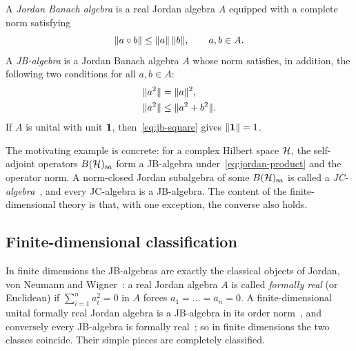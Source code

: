 \begin{definition}[JB-algebra]\label{def:jb-algebra}
A \emph{Jordan Banach algebra} is a real Jordan algebra $A$ equipped with a
complete norm satisfying
\begin{equation}\label{eq:submultiplicative}
  \lVert a \circ b \rVert \le \lVert a \rVert\,\lVert b \rVert, \qquad a,b\in A.
\end{equation}
A \emph{JB-algebra} is a Jordan Banach algebra $A$ whose norm satisfies, in
addition, the following two conditions for all $a,b\in A$:
\begin{align}
  \lVert a^2 \rVert &= \lVert a \rVert^2, \label{eq:jb-square}\\
  \lVert a^2 \rVert &\le \lVert a^2 + b^2 \rVert. \label{eq:jb-sum-of-squares}
\end{align}
If $A$ is unital with unit $\mathbf{1}$, then~\eqref{eq:jb-square} gives $\lVert \mathbf{1} \rVert=1$.
\end{definition}


The motivating example is concrete: for a complex Hilbert space $\mathcal{H}$, the
self-adjoint operators $B(\mathcal{H})_{\mathrm{sa}}$ form a JB-algebra under~\eqref{eq:jordan-product}
and the operator norm. A norm-closed Jordan subalgebra of some $B(\mathcal{H})_{\mathrm{sa}}$ is called a
\emph{JC-algebra}~\cite[3.1.2]{HancheOlsenStormer1984}, and every JC-algebra is a
JB-algebra. The content of the finite-dimensional theory is that, with one
exception, the converse also holds.

\subsection{Finite-dimensional classification}

In finite dimensions the JB-algebras are exactly the classical objects of
Jordan, von Neumann and Wigner~\cite{JordanVonNeumannWigner1934}: a real Jordan
algebra $A$ is called \emph{formally real} (or Euclidean) if
$\sum_{i=1}^n a_i^2 = 0$ in $A$ forces $a_1=\dots=a_n=0$. A finite-dimensional
unital formally real Jordan algebra is a JB-algebra in its order
norm~\cite[3.1.7]{HancheOlsenStormer1984}, and conversely every JB-algebra is
formally real~\cite[3.3.8]{HancheOlsenStormer1984}; so in finite dimensions the
two classes coincide. Their simple pieces are completely classified.

